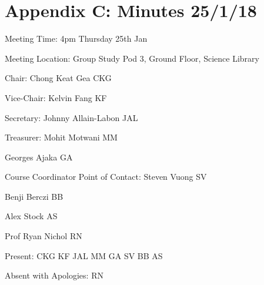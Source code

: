 \noindent 
\section{Appendix C: Minutes 25/1/18}

\noindent Meeting Time: 4pm Thursday 25th Jan

\noindent Meeting Location: Group Study Pod 3, Ground Floor, Science Library\textbf{}\\

\noindent 

\noindent \textbf{}

\noindent Chair: Chong Keat Gea CKG

\noindent Vice-Chair: Kelvin Fang KF

\noindent Secretary: Johnny Allain-Labon JAL

\noindent Treasurer: Mohit Motwani MM

\noindent Georges Ajaka GA

\noindent Course Coordinator Point of Contact: Steven Vuong SV

\noindent Benji Berczi BB

\noindent Alex Stock AS

\noindent Prof Ryan Nichol RN

\noindent 

\noindent Present: CKG KF JAL MM GA SV BB AS

\noindent Absent with Apologies: RN\\

\noindent 

